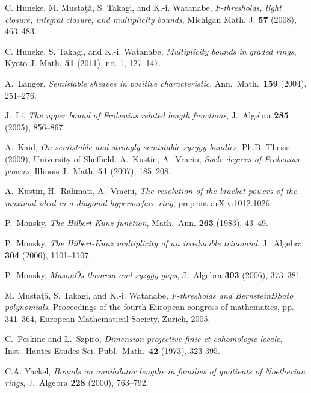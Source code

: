 \documentclass[draft]{amsart}
\theoremstyle{definition}
\numberwithin{equation}{theorem}
\begin{document}
\begin{thebibliography}{99}
C. Huneke, M. Musta{\c t}{\u a}, S. Takagi, and K.-i. Watanabe, 
\textit{$F$-thresholds, tight closure, integral closure, and multiplicity bounds}, Michigan Math. J. {\bf 57} (2008), 463--483.

C. Huneke, S. Takagi, and K.-i. Watanabe, 
\textit{Multiplicity bounds in graded rings}, Kyoto J. Math. {\bf 51} (2011), no. 1, 127--147.

A.\ Langer, 
\textit{Semistable sheaves in positive characteristic},
Ann.\ Math.\  {\bf 159} (2004), 251--276.

J.\ Li, 
\textit{The upper bound of Frobenius related length functions}, 
J.\ Algebra {\bf 285} (2005), 856--867.

A.\ Kaid,
\textit{On semistable and strongly semistable syzygy bundles}, Ph.D. Thesis (2009), University of Sheffield.
A.\ Kustin, A.\ Vraciu,  
\textit{Socle degrees of Frobenius powers},
Illinois J.\ Math. {\bf 51} (2007), 185--208.

A.\ Kustin, H.\ Rahmati, A.\ Vraciu,  
\textit{The resolution of the bracket powers of the maximal ideal in a diagonal hypersurface ring}, preprint
arXiv:1012.1026.

P.\ Monsky, 
\textit{The Hilbert-Kunz function},
Math.\ Ann. {\bf 263} (1983), 43--49.

P.\ Monsky, 
\textit{The Hilbert-Kunz multiplicity of an irreducible trinomial},
J.\ Algebra {\bf 304} (2006), 1101--1107.

P.\ Monsky, 
\textit{MasonÕs theorem and syzygy gaps},
J.\ Algebra {\bf 303} (2006), 373--381.

M. Musta{\c t}{\u a}, S. Takagi, and K.-i. Watanabe,
\textit{F-thresholds and BernsteinÐSato polynomials}, Proceedings of the fourth European congress of mathematics, pp. 341--364, European Mathematical Society, {\" Z}urich, 2005.

 C.\ Peskine and L.\ Szpiro, \textit{Dimension
projective finie et cohomologic locale}, Inst.\ Hautes Etudes Sci.
Publ.\ Math.\ \textbf{42} (1973), 323-395.

C.A. Yackel, 
\textit{Bounds on annihilator lengths in families of quotients of Noetherian rings}, 
J.\ Algebra {\bf 228} (2000), 763--792.

\end{thebibliography}
\end{document}
